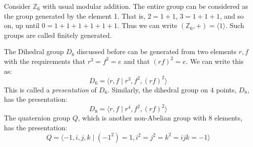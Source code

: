         \begin{example}
            Consider $\mathbb{Z}_{6}$ with usual modular addition. The entire
            group can be considered as the group generated by the element 1.
            That is, $2=1+1$, $3=1+1+1$, and so on, up until $0=1+1+1+1+1+1$.
            Thus we can write $(\mathbb{Z}_{6},+)=\langle{1}\rangle$. Such
            groups are called finitely generated.
        \end{example}
        \begin{example}
            The Dihedral group $D_{6}$ discussed before can be generated from
            two elements $r,f$ with the requirements that $r^{3}=f^{2}=e$ and
            that $(rf)^{2}=e$. We can write this as:
            \begin{equation}
                D_{6}=\langle{r},f\;|\;r^{3},f^{2},(rf)^{2}\rangle
            \end{equation}
            This is called a \textit{presentation}%
             of $D_{6}$. Similarly, the dihedral
            group on $4$ points, $D_{8}$, has the presentation:
            \begin{equation}
                D_{8}=\langle{r},f\;|\;r^{4},f^{2},(rf)^{2}\rangle
            \end{equation}
            The quaternion group $Q$, which is another non-Abelian group with 8
            elements, has the presentation:
            \begin{equation}
                Q=\langle\minus{1},i,j,k\;|\;(\minus{1}^{2})=1,
                    i^{2}=j^{2}=k^{2}=ijk=\minus{1}\rangle
            \end{equation}
        \end{example}
